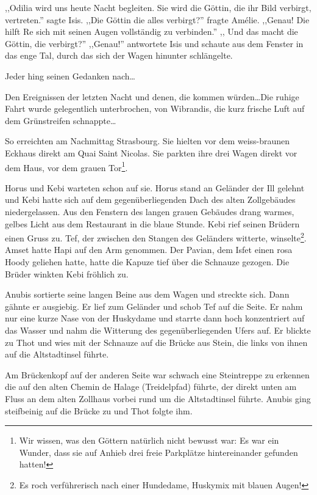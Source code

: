 ,,Odilia wird uns heute Nacht begleiten. Sie wird die Göttin, die ihr Bild verbirgt, vertreten.'' sagte Isis. ,,Die Göttin die alles verbirgt?'' fragte Amélie. ,,Genau! Die hilft Re sich mit seinen Augen vollständig zu verbinden.'' ,, Und das macht die Göttin, die  verbirgt?'' ,,Genau!'' antwortete Isis und schaute aus dem Fenster in das enge Tal, durch das sich der Wagen hinunter schlängelte.

\sterne

Jeder hing seinen Gedanken nach\dots

Den Ereignissen der letzten Nacht und denen, die kommen würden\dots Die ruhige Fahrt wurde gelegentlich unterbrochen, von Wibrandis, die kurz frische Luft auf dem Grünstreifen schnappte\dots

So erreichten am Nachmittag Strasbourg. Sie hielten vor dem weiss-braunen Eckhaus direkt am Quai Saint Nicolas. Sie parkten ihre drei Wagen direkt vor dem Haus, vor dem grauen Tor\footnote{Wir wissen, was den Göttern natürlich nicht bewusst war: Es war ein Wunder, dass sie auf Anhieb drei freie Parkplätze hintereinander gefunden hatten!}.

Horus und Kebi warteten schon auf sie. Horus stand an Geländer der Ill gelehnt und Kebi hatte sich auf dem gegenüberliegenden Dach des  alten Zollgebäudes niedergelassen. Aus den Fenstern des langen grauen Gebäudes drang warmes, gelbes Licht aus dem Restaurant in die blaue Stunde. Kebi rief seinen Brüdern einen Gruss zu. Tef, der zwischen den Stangen des Geländers witterte, winselte\footnote{Es roch verführerisch nach einer Hundedame, Huskymix mit blauen Augen!}. Amset hatte Hapi auf den Arm genommen. Der Pavian, dem Isfet einen rosa Hoody geliehen hatte, hatte die Kapuze tief über die Schnauze gezogen. Die Brüder winkten Kebi fröhlich zu.

Anubis sortierte seine langen Beine aus dem Wagen und streckte sich. Dann gähnte er ausgiebig. Er lief zum Geländer und schob Tef auf die Seite. Er nahm nur eine kurze Nase von der Huskydame und starrte dann hoch konzentriert auf das Wasser und nahm die Witterung des gegenüberliegenden Ufers auf. Er blickte zu Thot und wies mit der Schnauze auf die Brücke aus Stein, die links von ihnen auf die Altstadtinsel führte.

Am Brückenkopf auf der anderen Seite war schwach eine Steintreppe zu erkennen die auf den alten Chemin de Halage (Treidelpfad) führte, der direkt unten am Fluss an dem alten Zollhaus vorbei rund um die Altstadtinsel führte. Anubis ging steifbeinig auf die Brücke zu und Thot folgte ihm.

